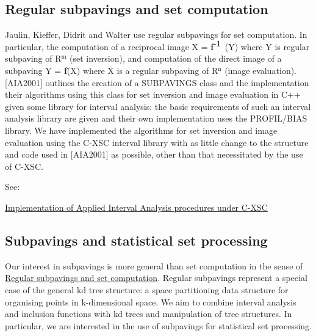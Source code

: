 \hypertarget{pavproc_setcomputation}{}\subsection{\-Regular subpavings and set computation}\label{pavproc_setcomputation}
\-Jaulin, \-Kieffer, \-Didrit and \-Walter use regular subpavings for set computation. \-In particular, the computation of a reciprocal image \-X = {\bfseries f}$^{\mbox{-\/1}}$ (\-Y) where \-Y is regular subpaving of \-R$^{\mbox{m}}$  (set inversion), and computation of the direct image of a subpaving \-Y = {\bfseries f}(\-X) where \-X is a regular subpaving of \-R$^{\mbox{n}}$  (image evaluation). \mbox{[}\-A\-I\-A2001\mbox{]} outlines the creation of a \-S\-U\-B\-P\-A\-V\-I\-N\-G\-S class and the implementation their algorithms using this class for set inversion and image evaluation in \-C++ given some library for interval analysis\-: the basic requirements of such an interval analysis library are given and their own implementation uses the \-P\-R\-O\-F\-I\-L/\-B\-I\-A\-S library. \-We have implemented the algorithms for set inversion and image evaluation using the \-C-\/\-X\-S\-C interval library with as little change to the structure and code used in \mbox{[}\-A\-I\-A2001\mbox{]} as possible, other than that necessitated by the use of \-C-\/\-X\-S\-C.

\-See\-:
\begin{DoxyItemize}
\item \hyperlink{AIASubPavings}{\-Implementation of \-Applied \-Interval \-Analysis procedures under \-C-\/\-X\-S\-C}
\end{DoxyItemize}



\hypertarget{pavproc_statssetprocessing}{}\subsection{\-Subpavings and statistical set processing}\label{pavproc_statssetprocessing}
\-Our interest in subpavings is more general than set computation in the sense of \hyperlink{pavproc_setcomputation}{\-Regular subpavings and set computation}. \-Regular subpavings represent a special case of the general kd tree structure\-: a space partitioning data structure for organising points in k-\/dimensional space. \-We aim to combine interval analysis and inclusion functions with kd trees and manipulation of tree structures. \-In particular, we are interested in the use of subpavings for statistical set processing.

